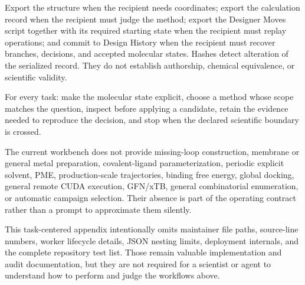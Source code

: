 Export the structure when the recipient needs coordinates; export the calculation record when the recipient must judge the method; export the Designer Moves script together with its required starting state when the recipient must replay operations; and commit to Design History when the recipient must recover branches, decisions, and accepted molecular states. Hashes detect alteration of the serialized record. They do not establish authorship, chemical equivalence, or scientific validity.

For every task: make the molecular state explicit, choose a method whose scope matches the question, inspect before applying a candidate, retain the evidence needed to reproduce the decision, and stop when the declared scientific boundary is crossed.


The current workbench does not provide missing-loop construction, membrane or general metal preparation, covalent-ligand parameterization, periodic explicit solvent, PME, production-scale trajectories, binding free energy, global docking, general remote CUDA execution, GFN/xTB, general combinatorial enumeration, or automatic campaign selection. Their absence is part of the operating contract rather than a prompt to approximate them silently.

{\footnotesize
This task-centered appendix intentionally omits maintainer file paths, source-line numbers, worker lifecycle details, JSON nesting limits, deployment internals, and the complete repository test list. Those remain valuable implementation and audit documentation, but they are not required for a scientist or agent to understand how to perform and judge the workflows above.\par}
\endgroup
